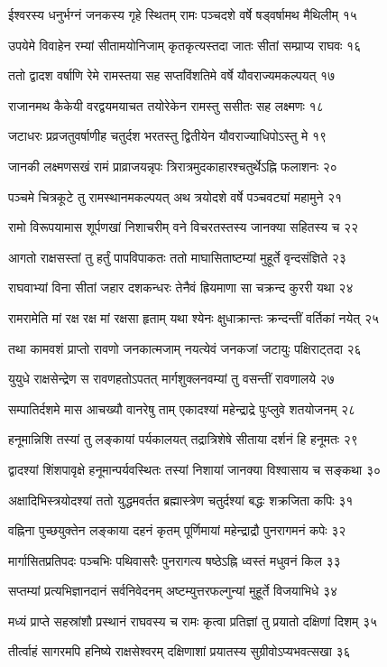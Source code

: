 ईश्वरस्य धनुर्भग्नं जनकस्य गृहे स्थितम्
रामः पञ्चदशे वर्षे षड्वर्षामथ मैथिलीम् १५

उपयेमे विवाहेन रम्यां सीतामयोनिजाम्
कृतकृत्यस्तदा जातः सीतां सम्प्राप्य राघवः १६

ततो द्वादश वर्षाणि रेमे रामस्तया सह
सप्तविंशतिमे वर्षे यौवराज्यमकल्पयत् १७

राजानमथ कैकेयी वरद्वयमयाचत
तयोरेकेन रामस्तु ससीतः सह लक्ष्मणः १८

जटाधरः प्रव्रजतुवर्षाणीह चतुर्दश
भरतस्तु द्वितीयेन यौवराज्याधिपोऽस्तु मे १९

जानकी लक्ष्मणसखं रामं प्राव्राजयन्नृपः
त्रिरात्रमुदकाहारश्चतुर्थेऽह्नि फलाशनः २०

पञ्चमे चित्रकूटे तु रामस्थानमकल्पयत्
अथ त्रयोदशे वर्षे पञ्चवट्यां महामुने २१

रामो विरूपयामास शूर्पणखां निशाचरीम्
वने विचरतस्तस्य जानक्या सहितस्य च २२

आगतो राक्षसस्तां तु हर्तुं पापविपाकतः
ततो माघासिताष्टम्यां मुहूर्ते वृन्दसंज्ञिते २३

राघवाभ्यां विना सीतां जहार दशकन्धरः
तेनैवं ह्रियमाणा सा चक्रन्द कुररी यथा २४

रामरामेति मां रक्ष रक्ष मां रक्षसा हृताम्
यथा श्येनः क्षुधाक्रान्तः क्रन्दन्तीं वर्तिकां नयेत् २५

तथा कामवशं प्राप्तो रावणो जनकात्मजाम्
नयत्येवं जनकजां जटायुः पक्षिराट्तदा २६

युयुधे राक्षसेन्द्रेण स रावणहतोऽपतत्
मार्गशुक्लनवम्यां तु वसन्तीं रावणालये २७

सम्पातिर्दशमे मास आचख्यौ वानरेषु ताम्
एकादश्यां महेन्द्राद्रे पुःप्लुवे शतयोजनम् २८

हनूमान्निशि तस्यां तु लङ्कायां पर्यकालयत्
तद्रात्रिशेषे सीताया दर्शनं हि हनूमतः २९

द्वादश्यां शिंशपावृक्षे हनूमान्पर्यवस्थितः
तस्यां निशायां जानक्या विश्वासाय च सङ्कथा ३०

अक्षादिभिस्त्रयोदश्यां ततो युद्धमवर्तत
ब्रह्मास्त्रेण चतुर्दश्यां बद्धः शक्रजिता कपिः ३१

वह्निना पुच्छयुक्तेन लङ्काया दहनं कृतम्
पूर्णिमायां महेन्द्राद्रौ पुनरागमनं कपेः ३२

मार्गासितप्रतिपदः पञ्चभिः पथिवासरैः
पुनरागत्य षष्ठेऽह्नि ध्वस्तं मधुवनं किल ३३

सप्तम्यां प्रत्यभिज्ञानदानं सर्वनिवेदनम्
अष्टम्युत्तरफल्गुन्यां मुहूर्ते विजयाभिधे ३४

मध्यं प्राप्ते सहस्रांशौ प्रस्थानं राघवस्य च
रामः कृत्वा प्रतिज्ञां तु प्रयातो दक्षिणां दिशम् ३५

तीर्त्वाहं सागरमपि हनिष्ये राक्षसेश्वरम्
दक्षिणाशां प्रयातस्य सुग्रीवोऽप्यभवत्सखा ३६

